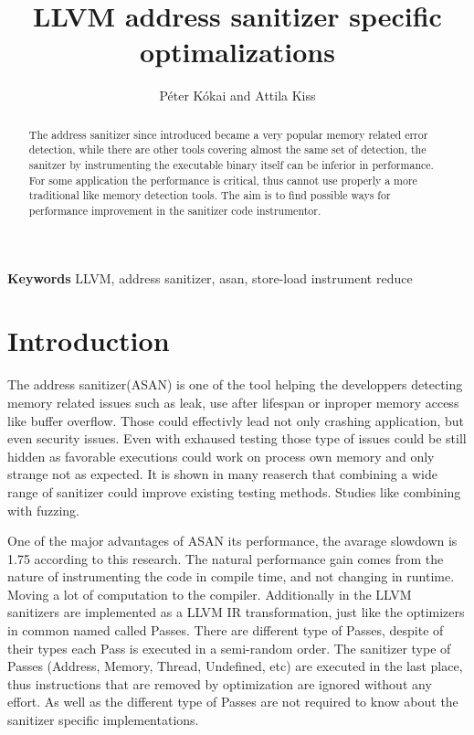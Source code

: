 \documentclass[letterpaper, 10 pt, conference]{llncs}  %
\title{\LARGE \bf
LLVM address sanitizer specific optimalizations
}
\author{P\'eter K\'okai and Attila Kiss}
\let\cite\parencite
\begin{document}
\maketitle
\thispagestyle{empty}
\pagestyle{empty}


\begin{abstract}
The address sanitizer since introduced became a very popular memory related error detection, while there are other tools covering almost the same set of detection, the sanitzer by instrumenting the executable binary itself can be inferior in performance. For some application the performance is critical, thus cannot use properly a more traditional like memory detection tools.
The aim is to find possible ways for performance improvement in the sanitizer code instrumentor.


\end{abstract} \hspace{10pt}

\small \textbf{Keywords} LLVM, address sanitizer, asan, store-load instrument reduce



\section{Introduction}

The address sanitizer(ASAN) is one of the tool helping the developpers detecting memory related issues such as leak, use after lifespan or inproper memory access like buffer overflow. Those could effectivly lead not only crashing application, but even security issues. Even with exhaused testing those type of issues could be still hidden as favorable executions could work on process own memory and only strange not as expected. It is shown in many reaserch that combining a wide range of sanitizer could improve existing testing methods. Studies like combining with fuzzing\cite{alkazimi2016heartbleed}\cite{bohme2017directed}.

One of the major advantages of ASAN its performance, the avarage slowdown is 1.75 according to this research\cite{serebryany2012addresssanitizer}. The natural performance gain comes from the nature of instrumenting the code in compile time, and not changing in runtime. Moving a lot of computation to the compiler. Additionally in the LLVM sanitizers are implemented as a LLVM IR\cite{llvm-ir} transformation, just like the optimizers in common named called Passes. There are different type of Passes, despite of their types each Pass is executed in a semi-random order. The sanitizer type of Passes (Address, Memory, Thread, Undefined, etc) are executed in the last place, thus instructions that are removed by optimization are ignored without any effort. As well as the different type of Passes are not required to know about the sanitizer specific implementations.
\end{document}
